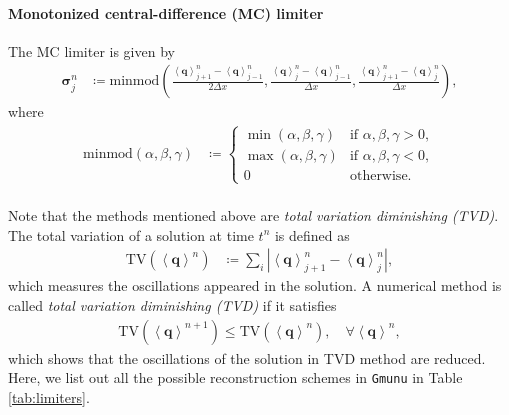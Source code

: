 \paragraph{Monotonized central-difference (MC) limiter}
The MC limiter \cite{van1974towards} is given by
\begin{align}
    \mathbf{\sigma}^n_j &\coloneqq \text{minmod}\left(
    \frac{\left\langle \mathbf{q} \right\rangle^n_{j+1}-\left\langle \mathbf{q} \right\rangle^n_{j-1}}{2 \Delta x},
    \frac{\left\langle \mathbf{q} \right\rangle^n_j-\left\langle \mathbf{q} \right\rangle^n_{j-1}}{\Delta x},
    \frac{\left\langle \mathbf{q} \right\rangle^n_{j+1}-\left\langle \mathbf{q} \right\rangle^n_{j}}{\Delta x} \right),
\end{align}
where
\begin{align}
    \text{minmod}\left(\alpha, \beta, \gamma \right) &\coloneqq
    \begin{cases}
        \min\left(\alpha, \beta, \gamma\right) & \text{if } \alpha,\beta,\gamma > 0, \\
        \max\left(\alpha, \beta, \gamma\right) & \text{if } \alpha,\beta,\gamma < 0, \\
        0 & \text{otherwise}.
    \end{cases}
\end{align}\\
Note that the methods mentioned above are \textit{total variation diminishing (TVD)}.
The total variation of a solution at time $t^n$ is defined as
\begin{align}
    \text{TV}\left( \left\langle \mathbf{q} \right\rangle^n \right) &\coloneqq 
    \sum_i \left| \left\langle \mathbf{q} \right\rangle^n_{j+1} - \left\langle \mathbf{q} \right\rangle^n_j \right|,
\end{align}
which measures the oscillations appeared in the solution.
A numerical method is called \textit{total variation diminishing (TVD)} if it satisfies
\begin{align}\label{eq:TVD}
    \text{TV}\left( \left\langle \mathbf{q} \right\rangle^{n+1} \right) \leq
    \text{TV}\left( \left\langle \mathbf{q} \right\rangle^n \right), \quad \forall \left\langle \mathbf{q} \right\rangle^n,
\end{align}
which shows that the oscillations of the solution in TVD method are reduced.\\
Here, we list out all the possible reconstruction schemes in \texttt{Gmunu} in Table \ref{tab:limiters}.
